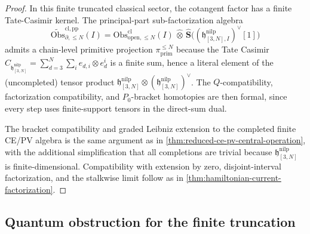 \begin{proof}
In this finite truncated classical sector, the cotangent factor has a finite
Tate-Casimir kernel. The principal-part sub-factorization algebra
$$\widetilde{\mathrm{Obs}}^{\mathrm{cl,pp}}_{\partial,\leq N}(I)
  =\mathrm{Obs}^{\mathrm{cl}}_{\mathrm{open},\leq N}(I)
   \,\widehat\otimes\,
   \widehat{\mathbf S}\bigl((\mathfrak h^{\mathrm{nilp}}_{[3,N],I})^\vee[1]\bigr)$$
    admits a chain-level primitive projection
    $\pi_{\mathrm{prim}}^{\leq N}$ because the Tate Casimir
    $C_{\mathfrak h^{\mathrm{nilp}}_{[3,N]}}=\sum_{d=3}^N\sum_i e_{d,i}\otimes e_d^i$
is a finite sum, hence a literal element of the (uncompleted) tensor
product $\mathfrak h^{\mathrm{nilp}}_{[3,N]}\otimes(\mathfrak h^{\mathrm{nilp}}_{[3,N]})^\vee$. The
$Q$-compatibility, factorization compatibility, and $P_0$-bracket
homotopies are then formal, since every step uses finite-support tensors
in the direct-sum dual.

The bracket compatibility and graded Leibniz extension to the completed
finite CE/PV algebra is the same argument as in
\ref{thm:reduced-ce-pv-central-operation}, with the additional
simplification that all completions are trivial because
$\mathfrak h^{\mathrm{nilp}}_{[3,N]}$ is finite-dimensional. Compatibility with
extension by zero, disjoint-interval factorization, and the
stalkwise limit follow as in
\ref{thm:hamiltonian-current-factorization}.
\end{proof}

\subsection*{Quantum obstruction for the finite truncation}

